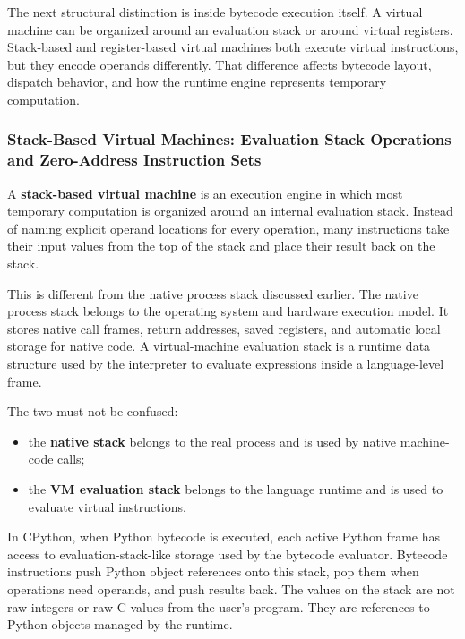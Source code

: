 The next structural distinction is inside bytecode execution itself. A virtual machine can be organized around an evaluation stack or around virtual registers. Stack-based and register-based virtual machines both execute virtual instructions, but they encode operands differently. That difference affects bytecode layout, dispatch behavior, and how the runtime engine represents temporary computation.





\subsubsection{Stack-Based Virtual Machines: Evaluation Stack Operations and Zero-Address Instruction Sets}

A \textbf{stack-based virtual machine} is an execution engine in which most temporary computation is organized around an internal evaluation stack. Instead of naming explicit operand locations for every operation, many instructions take their input values from the top of the stack and place their result back on the stack.

This is different from the native process stack discussed earlier. The native process stack belongs to the operating system and hardware execution model. It stores native call frames, return addresses, saved registers, and automatic local storage for native code. A virtual-machine evaluation stack is a runtime data structure used by the interpreter to evaluate expressions inside a language-level frame.

The two must not be confused:

\begin{itemize}
    \item the \textbf{native stack} belongs to the real process and is used by native machine-code calls;
    \item the \textbf{VM evaluation stack} belongs to the language runtime and is used to evaluate virtual instructions.
\end{itemize}

In CPython, when Python bytecode is executed, each active Python frame has access to evaluation-stack-like storage used by the bytecode evaluator. Bytecode instructions push Python object references onto this stack, pop them when operations need operands, and push results back. The values on the stack are not raw integers or raw C values from the user's program. They are references to Python objects managed by the runtime.

